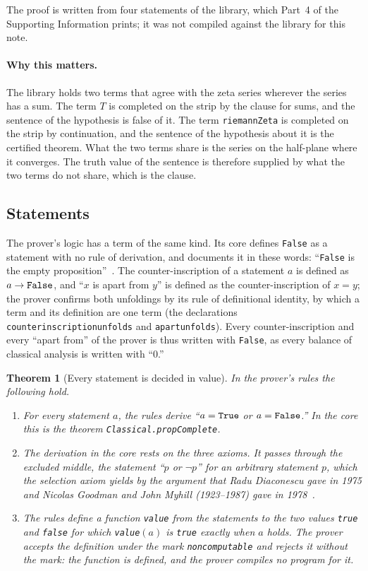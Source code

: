 \documentclass[11pt]{article}
\newtheorem{theorem}{Theorem}[section]
\theoremstyle{definition}
\theoremstyle{remark}
\DeclareRobustCommand{\lean}[1]{{\renewcommand{\_}{\textunderscore\allowbreak}\texttt{#1}}}
\newcommand{\True}{\lean{True}}
\newcommand{\False}{\lean{False}}
\begin{document}
\noindent The proof is written from four statements of the library, which Part~4 of the Supporting Information prints; it was not compiled against the library for this note.

\paragraph{Why this matters.} The library holds two terms that agree with the zeta series wherever the series has a sum. The term $T$ is completed on the strip by the clause for sums, and the sentence of the hypothesis is false of it. The term \lean{riemannZeta} is completed on the strip by continuation, and the sentence of the hypothesis about it is the certified theorem. What the two terms share is the series on the half-plane where it converges. The truth value of the sentence is therefore supplied by what the two terms do not share, which is the clause.

\subsection{Statements}

The prover's logic has a term of the same kind. Its core defines \False{} as a statement with no rule of derivation, and documents it in these words: ``\lean{False} is the empty proposition''~\citep{lean4}. The counter-inscription of a statement $a$ is defined as $a\to\False$, and ``$x$ is apart from $y$'' is defined as the counter-inscription of $x=y$; the prover confirms both unfoldings by its rule of definitional identity, by which a term and its definition are one term (the declarations \lean{counter\_inscription\_unfolds} and \lean{apart\_unfolds}). Every counter-inscription and every ``apart from'' of the prover is thus written with \False, as every balance of classical analysis is written with ``0.''

\begin{theorem}[Every statement is decided in value]\label{thm:value}
In the prover's rules the following hold.
\begin{enumerate}[leftmargin=2em,itemsep=1pt]
\item For every statement $a$, the rules derive ``$a=\True$ or $a=\False$.'' In the core this is the theorem \lean{Classical.propComplete}.
\item The derivation in the core rests on the three axioms. It passes through the excluded middle, the statement ``$p$ or $\neg p$'' for an arbitrary statement $p$, which the selection axiom yields by the argument that Radu Diaconescu gave in 1975 and Nicolas Goodman and John Myhill (1923--1987) gave in 1978~\citep{diaconescu,goodmanmyhill}.
\item The rules define a function \lean{value} from the statements to the two values \lean{true} and \lean{false} for which \lean{value}$(a)$ is \lean{true} exactly when $a$ holds. The prover accepts the definition under the mark \lean{noncomputable} and rejects it without the mark: the function is defined, and the prover compiles no program for it.
\end{enumerate}
\end{theorem}
\end{document}
